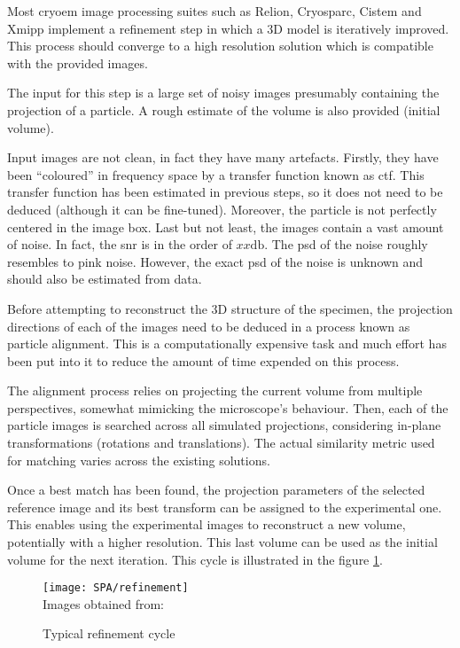 \documentclass[../main.tex]{subfiles}
\begin{document}
Most \gls{cryoem} image processing suites such as Relion\cite{scheres2021}, Cryosparc\cite{cryosparc}, Cistem\cite{grigorieff2018} and Xmipp\cite{sorzano2021} implement a refinement step in which a 3D model is iteratively improved. This process should converge to a high resolution solution which is compatible with the provided images. 

The input for this step is a large set of noisy images presumably containing the projection of a particle. A rough estimate of the volume is also provided (initial volume). 

Input images are not clean, in fact they have many artefacts. Firstly, they have been ``coloured'' in frequency space by a transfer function known as \gls{ctf}. This transfer function has been estimated in previous steps, so it does not need to be deduced (although it can be fine-tuned). Moreover, the particle is not perfectly centered in the image box. Last but not least, the images contain a vast amount of noise. In fact, the \gls{snr} is in the order of $xx \si{\decibel}$. The \gls{psd} of the noise roughly resembles to pink noise. However, the exact \gls{psd} of the noise is unknown and should also be estimated from data.

Before attempting to reconstruct the 3D structure of the specimen, the projection directions of each of the images need to be deduced in a process known as particle alignment. This is a computationally expensive task and much effort has been put into it to reduce the amount of time expended on this process. 

The alignment process relies on projecting the current volume from multiple perspectives, somewhat mimicking the microscope's behaviour. Then, each of the particle images is searched across all simulated projections, considering in-plane transformations (rotations and translations). The actual similarity metric used for matching varies across the existing solutions. 

Once a best match has been found, the projection parameters of the selected reference image and its best transform can be assigned to the experimental one. This enables using the experimental images to reconstruct a new volume, potentially with a higher resolution. This last volume can be used as the initial volume for the next iteration. This cycle is illustrated in the figure \ref{fig:3:refinement}. 

\begin{figure}[h]
    \centering
    \texttt{[image: SPA/refinement]}\\
    Images obtained from: \cite{nogales2015}
    \caption{Typical refinement cycle}
    \label{fig:3:refinement}
\end{figure}
\end{document}
